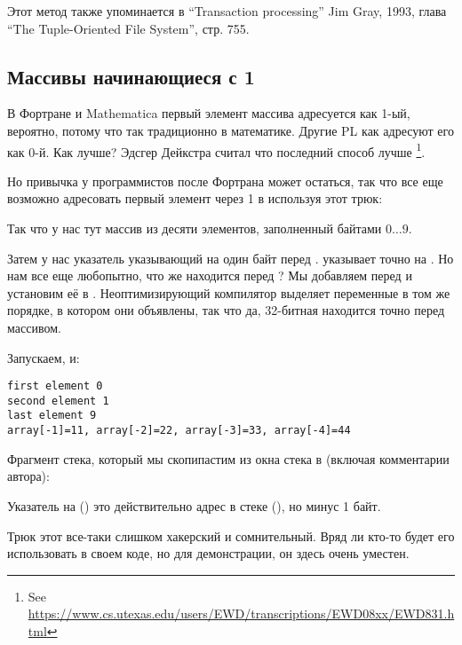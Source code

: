 Этот метод также упоминается в ``Transaction processing'' Jim Gray, 1993,
глава ``The Tuple-Oriented File System'', стр. 755.

\subsection{Массивы начинающиеся с 1}
\label{arrays_at_one}

В Фортране и Mathematica первый элемент массива адресуется как 1-ый, вероятно, потому что так традиционно в математике.
Другие \ac{PL} как \CCpp адресуют его как 0-й.
Как лучше?
Эдсгер Дейкстра считал что последний способ лучше
\footnote{See \url{https://www.cs.utexas.edu/users/EWD/transcriptions/EWD08xx/EWD831.html}}.

Но привычка у программистов после Фортрана может остаться, так что все еще возможно адресовать
первый элемент через 1 в \CCpp используя этот трюк:





Так что у нас тут массив  из десяти элементов, заполненный байтами $0 \ldots 9$.

Затем у нас указатель  указывающий на один байт перед .
 указывает точно на .
Но нам все еще любопытно, что же находится перед ?
Мы добавляем  перед  и установим её в .
Неоптимизирующий компилятор выделяет переменные в том же порядке, в котором они 
объявлены, так что да, 32-битная  находится точно перед массивом.

Запускаем, и:

\begin{lstlisting}
first element 0
second element 1
last element 9
array[-1]=11, array[-2]=22, array[-3]=33, array[-4]=44
\end{lstlisting}

Фрагмент стека, который мы скопипастим из окна стека в \olly (включая комментарии автора):



Указатель на  () это действительно адрес  в стеке (), 
но минус 1 байт.

Трюк этот все-таки слишком хакерский и сомнительный. Вряд ли кто-то будет его использовать в своем коде,
но для демонстрации, он здесь очень уместен.

